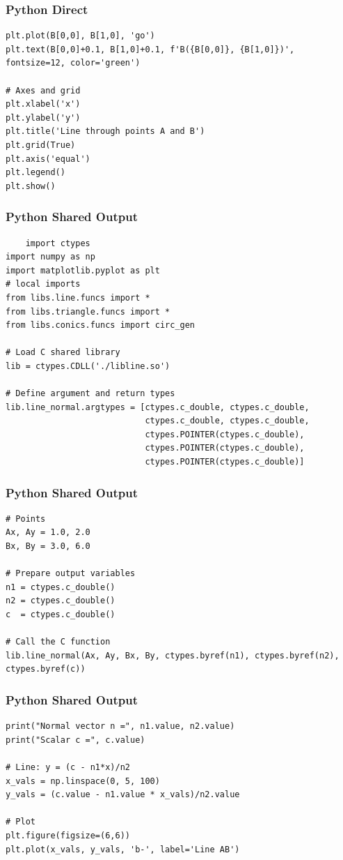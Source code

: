 \documentclass{beamer}
\begin{document}
\begin{frame}[fragile]
    \frametitle{Python Direct}
    \begin{lstlisting}
plt.plot(B[0,0], B[1,0], 'go')  
plt.text(B[0,0]+0.1, B[1,0]+0.1, f'B({B[0,0]}, {B[1,0]})', fontsize=12, color='green')

# Axes and grid
plt.xlabel('x')
plt.ylabel('y')
plt.title('Line through points A and B')
plt.grid(True)
plt.axis('equal')
plt.legend()
plt.show()
    \end{lstlisting}
\end{frame}
\begin{frame}[fragile]
    \frametitle{Python Shared Output}
    \begin{lstlisting}
    import ctypes
import numpy as np
import matplotlib.pyplot as plt
# local imports
from libs.line.funcs import *
from libs.triangle.funcs import *
from libs.conics.funcs import circ_gen

# Load C shared library
lib = ctypes.CDLL('./libline.so')

# Define argument and return types
lib.line_normal.argtypes = [ctypes.c_double, ctypes.c_double,
                            ctypes.c_double, ctypes.c_double,
                            ctypes.POINTER(ctypes.c_double),
                            ctypes.POINTER(ctypes.c_double),
                            ctypes.POINTER(ctypes.c_double)]
\end{lstlisting}
\end{frame}
\begin{frame}[fragile]
    \frametitle{Python Shared Output}
    \begin{lstlisting}
# Points
Ax, Ay = 1.0, 2.0
Bx, By = 3.0, 6.0

# Prepare output variables
n1 = ctypes.c_double()
n2 = ctypes.c_double()
c  = ctypes.c_double()

# Call the C function
lib.line_normal(Ax, Ay, Bx, By, ctypes.byref(n1), ctypes.byref(n2), ctypes.byref(c))
\end{lstlisting}
\end{frame}
\begin{frame}[fragile]
    \frametitle{Python Shared Output}
    \begin{lstlisting}
print("Normal vector n =", n1.value, n2.value)
print("Scalar c =", c.value)

# Line: y = (c - n1*x)/n2
x_vals = np.linspace(0, 5, 100)
y_vals = (c.value - n1.value * x_vals)/n2.value

# Plot
plt.figure(figsize=(6,6))
plt.plot(x_vals, y_vals, 'b-', label='Line AB')
\end{lstlisting}
\end{frame}
\end{document}
